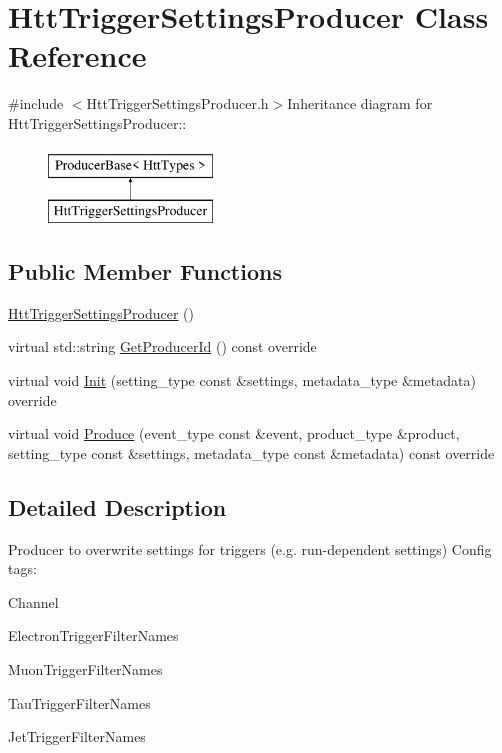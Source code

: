 \hypertarget{classHttTriggerSettingsProducer}{
\section{HttTriggerSettingsProducer Class Reference}
\label{classHttTriggerSettingsProducer}
}


{\ttfamily \#include $<$HttTriggerSettingsProducer.h$>$}Inheritance diagram for HttTriggerSettingsProducer::\begin{figure}[H]
\begin{center}
\leavevmode
\includegraphics[height=2cm]{classHttTriggerSettingsProducer}
\end{center}
\end{figure}
\subsection*{Public Member Functions}
\begin{DoxyCompactItemize}
\item 
\hyperlink{classHttTriggerSettingsProducer_a3c34bbb4cfd682c16185052aaec910f3}{HttTriggerSettingsProducer} ()
\item 
virtual std::string \hyperlink{classHttTriggerSettingsProducer_a31b44c47c6a23463ffc9b6b649beb7ae}{GetProducerId} () const override
\item 
virtual void \hyperlink{classHttTriggerSettingsProducer_a30cc02de6aa44308f888170653930fc8}{Init} (setting\_\-type const \&settings, metadata\_\-type \&metadata) override
\item 
virtual void \hyperlink{classHttTriggerSettingsProducer_ad24b2f54c1c3740e2fa3c12bab665b6e}{Produce} (event\_\-type const \&event, product\_\-type \&product, setting\_\-type const \&settings, metadata\_\-type const \&metadata) const override
\end{DoxyCompactItemize}


\subsection{Detailed Description}
Producer to overwrite settings for triggers (e.g. run-\/dependent settings) Config tags:
\begin{DoxyItemize}
\item Channel
\item ElectronTriggerFilterNames
\item MuonTriggerFilterNames
\item TauTriggerFilterNames
\item JetTriggerFilterNames 
\end{DoxyItemize}

